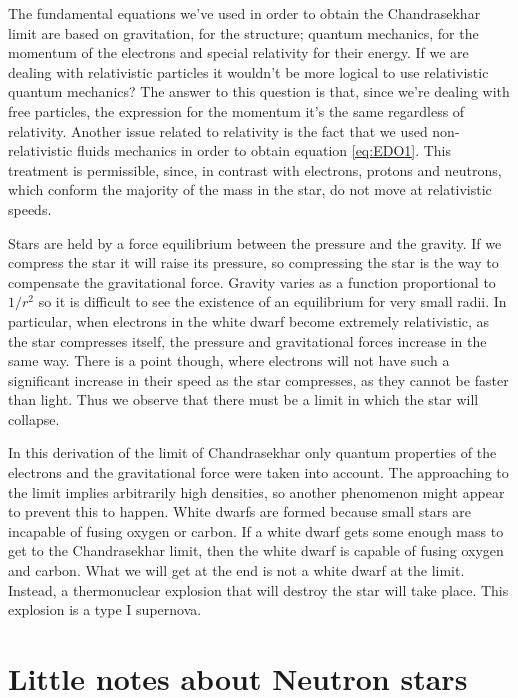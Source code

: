 \documentclass[a4paper]{article}
\begin{document}
The fundamental equations we’ve used in order to obtain the Chandrasekhar limit are based on gravitation, for the structure; quantum mechanics, for the momentum of the electrons and special relativity for their energy. If we are dealing with relativistic particles it wouldn’t be more logical to use relativistic quantum mechanics? The answer to this question is that, since we’re dealing with free particles, the expression for the momentum it’s the same regardless of relativity. Another issue related to relativity is the fact that we used non-relativistic fluids mechanics in order to obtain equation \eqref{eq:EDO1}. This treatment is permissible, since, in contrast with electrons, protons and neutrons, which conform the majority of the mass in the star,  do not move at relativistic speeds.

Stars are held by a force equilibrium between the pressure and the gravity. If we compress the star it will raise its pressure, so compressing the star is the way to compensate the gravitational force. Gravity varies as a function proportional to $1/r^2$ so it is difficult to see the existence of an equilibrium for very small radii. In particular, when electrons in the white dwarf become extremely relativistic, as the star compresses itself, the pressure and gravitational forces increase in the same way. There is a point though, where electrons will not have such a significant increase in their speed as the star compresses, as they cannot be faster than light. Thus we observe that there must be a limit in which the star will collapse.

In this derivation of the limit of Chandrasekhar only quantum properties of the electrons and the gravitational force were taken into account. The approaching to the limit implies arbitrarily high densities, so another phenomenon might appear to prevent this to happen. White dwarfs are formed because small stars are incapable of fusing oxygen or carbon. If a white dwarf gets some enough mass to get to the Chandrasekhar limit, then the white dwarf is capable of fusing oxygen and carbon. What we will get at the end is not a white dwarf at the limit. Instead, a thermonuclear explosion that will destroy the star will take place. This explosion is a type I supernova.

\section{Little notes about Neutron stars}
\end{document}
